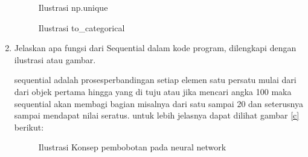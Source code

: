 \begin{enumerate}
\begin{figure}[!htbp]
      \caption{Ilustrasi  np.unique}
      \label{c119}
      \end{figure}

\begin{figure}[!htbp]
      \caption{Ilustrasi to\_categorical}
      \label{c120}
      \end{figure}

\item Jelaskan apa fungsi dari Sequential dalam kode program, dilengkapi dengan ilustrasi atau gambar. \par
sequential adalah prosesperbandingan setiap elemen satu persatu mulai dari dari objek pertama hingga yang di tuju atau jika mencari angka 100 maka sequential akan membagi bagian misalnya dari satu sampai 20 dan seterusnya sampai mendapat nilai seratus. untuk lebih jelasnya dapat dilihat gambar \ref{c}  berikut:

\begin{figure}[!htbp]
      \caption{Ilustrasi Konsep pembobotan pada neural network}
      \label{c121}
      \end{figure}
\end{enumerate}
